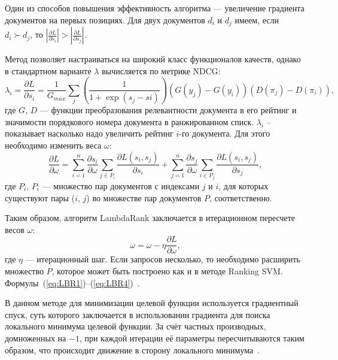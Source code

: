 Один из способов повышения эффективность алгоритма  --- увеличение градиента документов на первых позициях. Для двух документов $d_{i}$ и $d_{j}$ имеем, если $d_{i} \succ d_{j}$, то $| \frac{\partial L}{\partial s_{i}} | > | \frac{\partial L}{\partial s_{j}} |$.

Метод позволяет настраиваться на широкий класс функционалов качеств, однако в стандартном варианте $\lambda$ вычисляется по метрике NDCG:
\begin{equation}
	\label{eq:LBR2}
	\lambda_{i} = \frac{\partial L}{\partial s_{i}} = \frac{1}{G_{max}} \sum_{j}(\frac{1}{1 + \exp(s_{j} - s{i})})(G(y_{j}) - G(y_{i}))(D(\pi_{j}) - D(\pi_{i})),
\end{equation}
где  $G$, $D$ ---  функции преобразования релевантности документа в его рейтинг и значимости порядкового номера документа в ранжированном списк.  $\lambda_{i}$ – показывает насколько надо увеличить рейтинг $i$-го документа. Для этого необходимо изменить веса $\omega$:
\begin{equation}
	\label{eq:LBR3}
	\frac{\partial L}{\partial \omega} = \sum_{i=1}^{n}\frac{\partial s_{i}}{\partial \omega}\sum_{j \in P_{i}}\frac{\partial L(s_{i}, s_{j})}{\partial s_{i}} + \sum_{j=1}^{n}\frac{\partial s_{j}}{\partial \omega}\sum_{i \in P_{j}}\frac{\partial L(s_{i}, s_{j})}{\partial s_{j}},
\end{equation}
где $P_{i}$, $P_{i}$ --- множество пар документов с индексами $j$ и $i$, для которых существуют пары ($i$, $j$) во множестве пар документов $P$, соответственно.

Таким образом, алгоритм LambdaRank заключается в итерационном пересчете весов $\omega$:
\begin{equation}
	\label{eq:LBR4}
	\omega = \omega - \eta\frac{\partial L}{\partial \omega},
\end{equation}
где $\eta$ --- итерационный шаг. Если запросов несколько, то необходимо расширить множество $P$, которое может быть построено как и в методе Ranking SVM. Формулы~(\ref{eq:LBR1})--(\ref{eq:LBR4})~\cite{LamdaRank}.

В данном методе для минимизации целевой функции используется градиентный спуск, суть которого заключается в использовании градиента для поиска локального минимума целевой функции. За счёт частных производных, домноженных на $-1$, при каждой итерации её параметры пересчитываются таким образом, что происходит движение в сторону локального минимума~\cite{ML_no_wors}.

